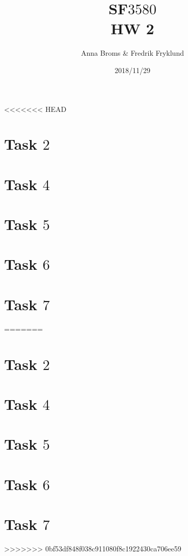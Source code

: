 \documentclass[a4paper]{article}
\title{SF$3580$\\HW 2}
\author{Anna Broms \& Fredrik Fryklund}
\date{2018/11/29}
\begin{document}
\maketitle

<<<<<<< HEAD
 \section{Task $2$}
%
 \section{Task $4$}
 \section{Task $5$}
% 
 \section{Task $6$}
 
\section{Task $7$}
%
=======
 \section*{Task $2$}
 
%
 \section*{Task $4$}
 
 \section*{Task $5$}
 
 \section*{Task $6$}
 
\section*{Task $7$}

>>>>>>> 0bf53df848f038c911080f8c1922430ca706ee59
\end{document}
